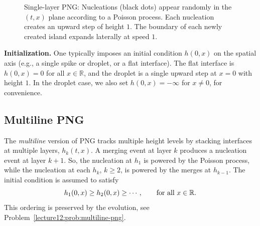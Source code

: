 \documentclass[letterpaper,11pt,oneside,reqno]{book}
\numberwithin{equation}{chapter}  %
\theoremstyle{definition}
\begin{document}
\begin{figure}[htpb]
\centering
{}
\caption{Single-layer PNG: Nucleations (black dots) appear randomly in the $(t,x)$ plane
according to a Poisson process. Each nucleation creates an upward step of height $1$. The boundary of each newly created island expands laterally at speed $1$.}
\label{lecture12:fig:png-single}
\end{figure}

\smallskip

\noindent\textbf{Initialization.} One typically imposes an initial condition $h(0,x)$ on the spatial axis (e.g., a single spike or droplet, or a flat interface).
The flat interface is $h(0,x)=0$ for all $x\in\mathbb{R}$, and the droplet is a single upward step at $x=0$ with height $1$. In the droplet case, we also set $h(0,x)=-\infty$ for $x\ne 0$, for
convenience.

\subsection{Multiline PNG}
\label{lecture12:sub:multiline-png}

The \emph{multiline} version of PNG tracks multiple height levels by stacking interfaces
at multiple layers, $h_k(t,x)$. A merging event
at layer $k$ produces a nucleation event at layer $k+1$.
So, the nucleation at $h_1$ is powered by the Poisson process,
while the nucleation at each $h_k$, $k\ge 2$, is powered by the merges at $h_{k-1}$.
The initial condition is assumed to satisfy
\begin{equation*}
	h_1(0,x) \ge h_2(0,x) \ge \cdots ,\qquad \textnormal{for all } x\in\mathbb{R}.
\end{equation*}
This ordering is preserved by the evolution,
see Problem~\ref{lecture12:prob:multiline-png}.
\end{document}
